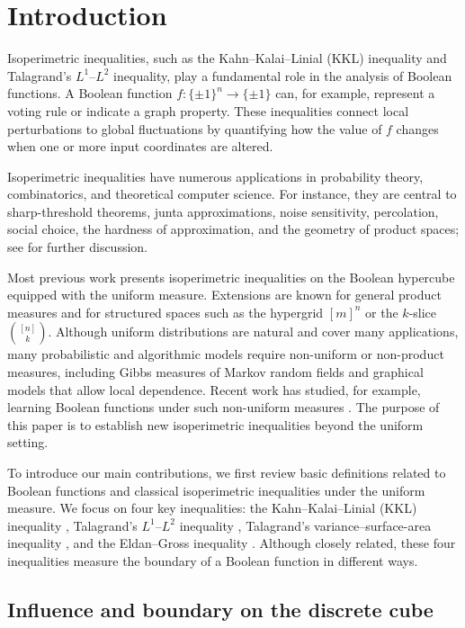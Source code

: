 \section{Introduction}

Isoperimetric inequalities, such as the Kahn--Kalai--Linial (KKL) inequality and Talagrand's \(L^1\)--\(L^2\) inequality, play a fundamental role in the analysis of Boolean functions. A Boolean function \(f:\{\pm 1\}^n \to \{\pm 1\}\) can, for example, represent a voting rule or indicate a graph property. These inequalities connect local perturbations to global fluctuations by quantifying how the value of \(f\) changes when one or more input coordinates are altered.

Isoperimetric inequalities have numerous applications in probability theory, combinatorics, and theoretical computer science. For instance, they are central to sharp-threshold theorems, junta approximations, noise sensitivity, percolation, social choice, the hardness of approximation, and the geometry of product spaces; see \cite{ODonnell14} for further discussion.

Most previous work presents isoperimetric inequalities on the Boolean hypercube equipped with the uniform measure. Extensions are known for general product measures and for structured spaces such as the hypergrid $[m]^n$ or the $k$-slice $\binom{[n]}{k}$.
Although uniform distributions are natural and cover many applications, many probabilistic and algorithmic models require non-uniform or non-product measures, including Gibbs measures of Markov random fields and graphical models that allow local dependence. Recent work has studied, for example, learning Boolean functions under such non-uniform measures \cite{CGMV26,FYYZ26}. The purpose of this paper is to establish new isoperimetric inequalities beyond the uniform setting.

To introduce our main contributions, we first review basic definitions related to Boolean functions and classical isoperimetric inequalities under the uniform measure. We focus on four key inequalities: the Kahn--Kalai--Linial (KKL) inequality \cite{KKL88}, Talagrand's \( L^1 \)--\( L^2 \) inequality \cite{Talagrand94}, Talagrand's variance--surface-area inequality \cite{Talagrand93}, and the Eldan--Gross inequality \cite{EldanGross22}. Although closely related, these four inequalities measure the boundary of a Boolean function in different ways.

\subsection{Influence and boundary on the discrete cube}


